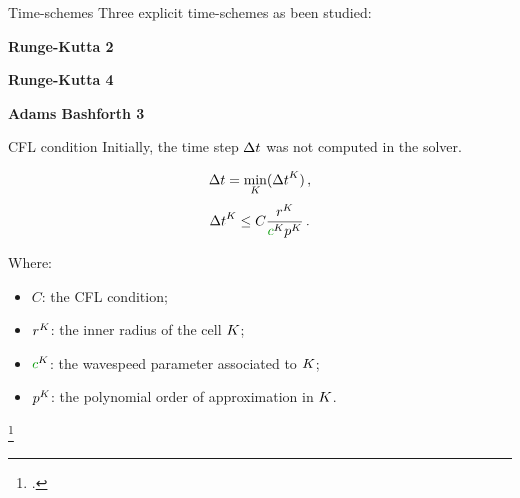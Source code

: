 \begin{frame}{Time-schemes}
\scriptsize
Three explicit time-schemes as been studied: \\
\begin{multicols}{3}
\textbf{Runge-Kutta 2}

\columnbreak

\textbf{Runge-Kutta 4}

\columnbreak

\textbf{Adams Bashforth 3}
\end{multicols}

\begin{block}{CFL condition\footnotemark}
Initially, the time step ${\Delta t}$ was not computed in the solver.

\begin{multicols}{2}
\begin{equation}
{\Delta t} = \underset{{K}}{\min}({\Delta t}^{K})\,,
\end{equation}
\begin{equation}
        \deltat^\elementK \le C \frac{r^\elementK}{\velocity^\elementK p^\elementK}\,.
\end{equation}
\vfill

\columnbreak
\tiny
Where:
\begin{itemize}
\item $C$: the CFL condition;
\item $r^{K}$: the inner radius of the cell ${K}$;
\item $\velocity^\elementK$: the wavespeed parameter associated to ${K}$;
\item $p^{K}$: the polynomial order of approximation in ${K}$.
\end{itemize}
\end{multicols}
\end{block}
\footcitetext{hesthavenNodalDiscontinuousGalerkin2007}
\end{frame}


